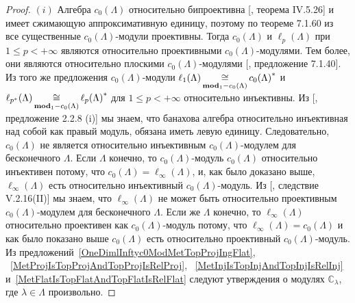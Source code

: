 \begin{proof} $(i)$ Алгебра $c_0(\Lambda)$ относительно бипроективна
[\cite{HelHomolBanTopAlg}, теорема IV.5.26] и имеет сжимающую аппроксимативную
единицу, поэтому по теореме 7.1.60 из~\cite{HelBanLocConvAlg} все существенные
$c_0(\Lambda)$-модули проективны. Тогда $c_0(\Lambda)$ и $\ell_p(\Lambda)$ при
$1\leq p<+\infty$ являются относительно проективными $c_0(\Lambda)$-модулями.
Тем более, они являются относительно плоскими $c_0(\Lambda)$-модулями
[\cite{HelBanLocConvAlg}, предложение 7.1.40]. Из того же предложения
$c_0(\Lambda)$-модули
$\ell_1(\Lambda)\mathop{\mathbin{\cong}}\limits_{\mathbf{mod}_1-c_0(\Lambda)}{c_0(\Lambda)}^*$ и
$\ell_{p^*}(\Lambda)\mathop{\mathbin{\cong}}\limits_{\mathbf{mod}_1-c_0(\Lambda)}{\ell_p(\Lambda)}^*$ для
$1\leq p<+\infty$ относительно инъективны. Из [\cite{RamsHomPropSemgroupAlg},
предложение 2.2.8 (i)] мы знаем, что банахова алгебра относительно инъективная
над собой как правый модуль, обязана иметь левую единицу. Следовательно,
$c_0(\Lambda)$ не является относительно инъективным $c_0(\Lambda)$-модулем для
бесконечного $\Lambda$. Если $\Lambda$ конечно, то $c_0(\Lambda)$-модуль
$c_0(\Lambda)$  относительно инъективен потому, что
$c_0(\Lambda)=\ell_\infty(\Lambda)$, и, как было доказано выше,
$\ell_\infty(\Lambda)$ есть относительно инъективный $c_0(\Lambda)$-модуль. Из
[\cite{HelHomolBanTopAlg}, следствие V.2.16(II)] мы знаем, что
$\ell_\infty(\Lambda)$ не может быть относительно проективным
$c_0(\Lambda)$-модулем для бесконечного $\Lambda$. Если же $\Lambda$ конечно, то
$\ell_\infty(\Lambda)$ относительно проективен как $c_0(\Lambda)$-модуль потому,
что  $\ell_\infty(\Lambda)=c_0(\Lambda)$ и как было показано выше $c_0(\Lambda)$
есть относительно проективный $c_0(\Lambda)$-модуль. Из
предложений~\ref{OneDimlInftyc0ModMetTopProjIngFlat},
~\ref{MetProjIsTopProjAndTopProjIsRelProj},
~\ref{MetInjIsTopInjAndTopInjIsRelInj}
и~\ref{MetFlatIsTopFlatAndTopFlatIsRelFlat} следуют утверждения о модулях
$\mathbb{C}_\lambda$, где $\lambda\in\Lambda$ произвольно.


\end{proof}
